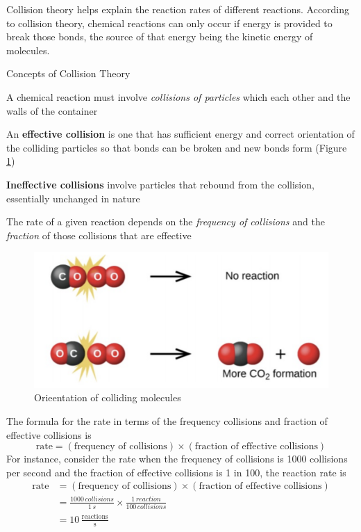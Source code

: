 Collision theory helps explain the reaction rates of different reactions. According to collision
theory, chemical reactions can only occur if energy is provided to break those bonds, the source
of that energy being the kinetic energy of molecules.

\begin{definition}{Concepts of Collision Theory}
    \begin{bulleted-list}
        \item A chemical reaction must involve \textit{collisions of particles} which each other
            and the walls of the container
        \item An \textbf{effective collision} is one that has sufficient energy and correct
            orientation of the colliding particles so that bonds can be broken and new bonds form
            (Figure \ref{fig:orientation-of-colliding-molecules})
        \item \textbf{Ineffective collisions} involve particles that rebound from the collision,
            essentially unchanged in nature
        \item The rate of a given reaction depends on the \textit{frequency of collisions} and the
            \textit{fraction} of those collisions that are effective
    \end{bulleted-list}
\end{definition}

\begin{figure}[ht!]
    \centering
    \includegraphics[width=0.6 \textwidth]{../figures/orientation of colliding molecules.png}
    \caption{Orieentation of colliding molecules}
    \label{fig:orientation-of-colliding-molecules}
\end{figure}

The formula for the rate in terms of the frequency collisions and fraction of effective collisions is
\[
    \text{rate}=(\text{frequency of collisions})\times(\text{fraction of effective collisions})
\]
For instance, consider the rate when the frequency of collisions is 1000 collisions per second and
the fraction of effective collisions is 1 in 100, the reaction rate is
\begin{align*}
    \text{rate}&=(\text{frequency of collisions})\times(\text{fraction of effective collisions})\\
               &=\frac{1000\,\si{collisions}}{1\,\si{s}}\times\frac{1\,\si{reaction}}{100\,\si{collisions}}\\
               &=10\,\frac{\text{reactions}}{\text{s}}
\end{align*}

